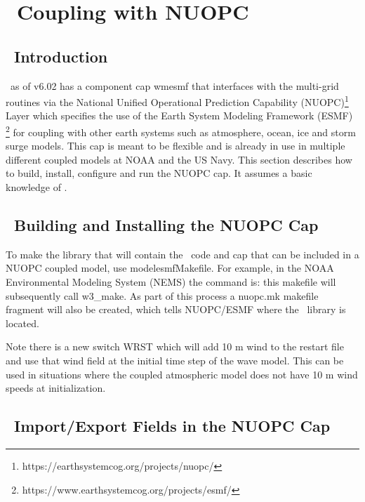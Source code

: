 \pagestyle{myheadings} \setcounter{page}{1} \setcounter{footnote}{0}

\section{~Coupling with NUOPC} \label{app:nuopc}
\newcounters

\vssub
\subsection{~Introduction} \label{sec:nuopcintro}
\vssub

\ws\ as of v6.02 has a component cap {\code wmesmf} that interfaces with the multi-grid routines via the 
National Unified Operational Prediction Capability (NUOPC)\footnote{https://earthsystemcog.org/projects/nuopc/}
Layer which specifies the use of the Earth System Modeling Framework (ESMF)
\footnote{https://www.earthsystemcog.org/projects/esmf/}   
for coupling with other earth systems such as atmosphere, ocean, ice and storm surge models. 
This cap is meant to be flexible and is already in use in multiple different coupled models at NOAA and the US Navy. 
This section describes how to build, install, configure and run the NUOPC cap.  It assumes a basic knowledge of \ws. 

\vssub
\subsection{~Building and Installing the NUOPC Cap} \label{sec:nuopcbuild}
\vssub

To make the library that will contain the \ws\ code and cap that can be included in a NUOPC coupled model, use
{\code model\/esmf\/Makefile}.  For example, in the NOAA Environmental Modeling System (NEMS) the command is: 
this makefile will subsequently call {\code w3\_make}. As part of this process a nuopc.mk makefile
fragment will also be created, which tells NUOPC/ESMF where the \ws\ library is located. 

Note there is a new switch {\code WRST} which will add 10 m wind to the restart file and use that wind field 
at the initial time step of the wave model. This can be used in situations where the coupled atmospheric model 
does not have 10 m wind speeds at initialization.

\vssub
\subsection{~Import/Export Fields in the NUOPC Cap} \label{sec:nuopcfields}
\vssub

